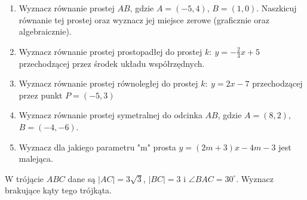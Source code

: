 \documentclass[12pt,a4paper]{article}
\begin{document}
	\begin{enumerate}[1.]
		\item Wyznacz równanie prostej $AB$, gdzie $A=(-5,4)$, $B=(1,0)$. Naszkicuj równanie tej prostej oraz wyznacz jej miejsce zerowe (graficznie oraz algebraicznie).
		\item Wyznacz równanie prostej prostopadłej do prostej $k: \: y=-\frac{2}{3}x+5$ przechodzącej przez środek układu współrzędnych.
		\item Wyznacz równanie prostej równoległej do prostej $k: \: y=2x-7$ przechodzącej przez punkt $P=(-5,3)$
		\item Wyznacz równanie prostej symetralnej do odcinka $AB$, gdzie $A=(8,2)$, $B=(-4,-6)$.
		\item Wyznacz dla jakiego parametru "m" prosta $y=(2m+3)x-4m-3$ jest malejąca.
	\end{enumerate}


	W trójącie $ABC$ dane są $|AC|=3\sqrt{3}$, $|BC|=3$ i $\angle BAC=30^\circ$. Wyznacz brakujące kąty tego trójkąta.
\end{document}
